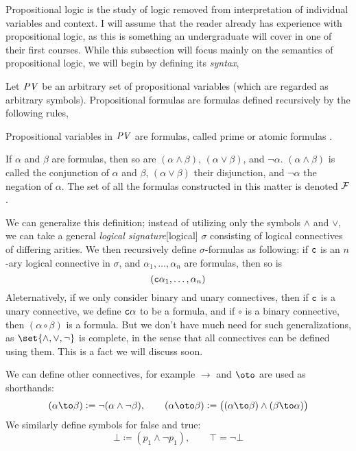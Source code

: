 Propositional logic is the study of logic removed from interpretation of individual variables and context.
I will assume that the reader already has experience with propositional logic, as this is something an undergraduate will cover in one of their first courses.
While this subsection will focus mainly on the semantics of propositional logic, we will begin by defining its {\it syntax},

\def\PV{{\it PV}}
\def\mF{{\cal F}}
\bdefn

    Let $\PV$ be an arbitrary set of {\emphcolor propositional variables} (which are regarded as arbitrary symbols).
    {\emphcolor Propositional formulas} are formulas defined recursively by the following rules,
    \benum
        \item Propositional variables in $\PV$ are formulas, called {\emphcolor prime} or {\emphcolor atomic} formulas%
        .
        \item If $\alpha$ and $\beta$ are formulas, then so are $(\alpha\land\beta)$, $(\alpha\lor\beta)$, and $\neg\alpha$.
        $(\alpha\land\beta)$ is called the {\emphcolor conjunction} of $\alpha$ and $\beta$, $(\alpha\lor\beta)$ their {\emphcolor disjunction}, and
        $\neg\alpha$ the {\emphcolor negation} of $\alpha$.
    \eenum
    The set of all the formulas constructed in this matter is denoted $\mF$.

\edefn

We can generalize this definition; instead of utilizing only the symbols $\land$ and $\lor$, we can take a general {\it logical signature}[logical] $\sigma$ consisting of logical
connectives of differing arities.
We then recursively define $\sigma$-formulas as following: if ${\tt c}$ is an $n$-ary logical connective in $\sigma$, and $\alpha_1,\dots,\alpha_n$ are formulas, then so is
$$ ({\tt c}\alpha_1,\dots,\alpha_n) $$
Aleternatively, if we only consider binary and unary connectives, then if ${\tt c}$ is a unary connective, we define ${\tt c}\alpha$ to be a formula, and if $\circ$ is a binary connective, then
$(\alpha\circ\beta)$ is a formula.
But we don't have much need for such generalizations, as $\set{\land, \lor, \neg}$ is complete, in the sense that all connectives can be defined using them.
This is a fact we will discuss soon.

We can define other connectives, for example $\to$ and $\oto$ are used as shorthands:
$$ (\alpha\to\beta) \coloneqq \neg(\alpha\land\neg\beta),\qquad (\alpha\oto\beta) \coloneqq \bigl((\alpha\to\beta)\land(\beta\to\alpha)\bigr) $$
We similarly define symbols for false and true:
$$ \bot \coloneqq (p_1\land\neg p_1),\qquad \top = \neg\bot $$

